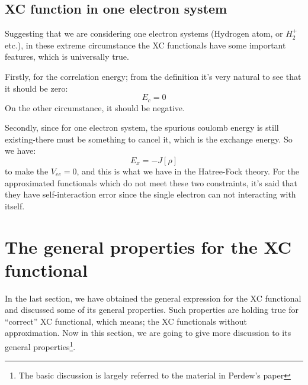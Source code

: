 \subsection{XC function in one electron system}
\label{XC_functional_one_electron}
%
%
%
%
Suggesting that we are considering one electron systems (Hydrogen atom, or 
$H_{2}^{+}$ etc.), in these extreme circumstance the XC functionals have some
important features, which is universally true.

Firstly, for the correlation energy; from the definition it's very natural to
see that it should be zero:
\begin{equation}
E_{c}  = 0
 \label{XC_functional_one_electron_eq:1}
\end{equation}
On the other circumstance, it should be negative.

Secondly, since for one electron system, the spurious coulomb energy is still
existing-there must be something to cancel it, which is the exchange energy.
So we have:
\begin{equation}
E_{x}  = -J[\rho]
 \label{XC_functional_one_electron_eq:2}
\end{equation}
to make the $V_{ee} = 0$, and this is what we have in the Hatree-Fock theory.
For the approximated functionals which do not meet these two constraints, it's
said that they have self-interaction error since the single electron can not
interacting with itself.





\section{The general properties for the XC functional}
\label{DFTI:5}
%
%
%
In the last section, we have obtained the general expression for the 
XC functional and discussed some of its general properties. Such properties
are holding true for ``correct'' XC functional, which means; the XC
functionals without approximation. Now in this section, we are going to give
more discussion to its general properties\footnote{The basic discussion is
largely referred to the material in Perdew's paper\cite{DFT_PAPERS_GATHERING} }.

